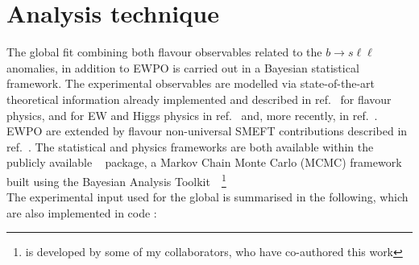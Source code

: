\section{Analysis technique}
\label{sec:strategy}
The global fit combining both flavour observables related to the $ b \to s \ell \ell$ anomalies, in addition to EWPO is carried out in a Bayesian statistical framework. The experimental observables are modelled via state-of-the-art theoretical information already implemented and described in ref.~\cite{Ciuchini:2019usw} for flavour physics, and for EW and Higgs physics in ref.~\cite{Ciuchini:2013pca} and, more recently, in ref.~\cite{deBlas:2016ojx}. EWPO are extended by flavour non-universal  SMEFT contributions described in ref.~\cite{Efrati:2015eaa,deBlas:2019wgy}. The statistical and physics frameworks are both available within the publicly available \HEPfit~\cite{deBlas:2019okz} package, a Markov Chain Monte Carlo (MCMC) framework built using the Bayesian Analysis Toolkit~\cite{2009CoPhC.180.2197C}~\footnote{ \HEPfit is developed by some of my collaborators, who have co-authored this work}\\
The experimental input used for the global is summarised in the following, which are also implemented in \HEPfit code : 
